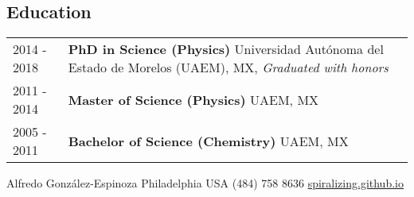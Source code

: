 \documentclass[lighthipster]{simplehipstercv}
\newlength{\rightcolwidth}
\begin{document}
\begin{paracol}{2}
\section*{Education}
\begin{tabularx}{\linewidth}{@{}l X@{}}	
2014 - 2018 & {\bf PhD in Science (Physics)} Universidad Autónoma del Estado de Morelos (UAEM), MX, \em{Graduated with honors} \\
2011 - 2014 & {\bf Master of Science (Physics)} UAEM, MX \\ 

2005 - 2011 & {\bf Bachelor of Science (Chemistry)} UAEM, MX \\
\end{tabularx}

\vspace{0.2cm} %

\setlength{\parindent}{0pt}
\begin{minipage}[t]{\rightcolwidth}
\begin{center}\fontfamily{\sfdefault}\selectfont \color{black!70}
{\small Alfredo Gonz\'alez-Espinoza  Philadelphia USA  (484) 758 8636 \newline{} \protect\url{spiralizing.github.io}
}
\end{center}
\end{minipage}

\end{paracol}
\end{document}
